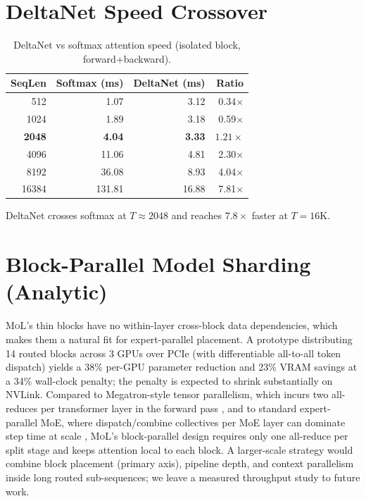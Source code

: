 \documentclass[10pt]{article}
\newcommand{\mol}{\textsc{MoL}}
\begin{document}
\section{DeltaNet Speed Crossover}
\label{app:speed_crossover}

\begin{table}[h]
\centering
\caption{DeltaNet vs softmax attention speed (isolated block, forward+backward).}
\label{tab:speed_crossover}
\small
\begin{tabular}{rrrr}
\toprule
SeqLen & Softmax (ms) & DeltaNet (ms) & Ratio \\
\midrule
512 & 1.07 & 3.12 & 0.34$\times$ \\
1024 & 1.89 & 3.18 & 0.59$\times$ \\
\textbf{2048} & \textbf{4.04} & \textbf{3.33} & $\mathbf{1.21\times}$ \\
4096 & 11.06 & 4.81 & 2.30$\times$ \\
8192 & 36.08 & 8.93 & 4.04$\times$ \\
16384 & 131.81 & 16.88 & 7.81$\times$ \\
\bottomrule
\end{tabular}
\end{table}

DeltaNet crosses softmax at $T{\approx}2048$ and reaches $7.8\times$ faster at $T{=}16$K.

\section{Block-Parallel Model Sharding (Analytic)}
\label{app:parallelism}

\mol{}'s thin blocks have no within-layer cross-block data dependencies, which makes them a natural fit for expert-parallel placement.
A prototype distributing 14 routed blocks across 3 GPUs over PCIe (with differentiable all-to-all token dispatch) yields a 38\% per-GPU parameter reduction and 23\% VRAM savings at a 34\% wall-clock penalty; the penalty is expected to shrink substantially on NVLink.
Compared to Megatron-style tensor parallelism, which incurs two all-reduces per transformer layer in the forward pass \citep{narayanan2021efficient}, and to standard expert-parallel MoE, where dispatch/combine collectives per MoE layer can dominate step time at scale \citep{deepseekv3}, \mol{}'s block-parallel design requires only one all-reduce per split stage and keeps attention local to each block.
A larger-scale strategy would combine block placement (primary axis), pipeline depth, and context parallelism inside long routed sub-sequences; we leave a measured throughput study to future work.
\end{document}
